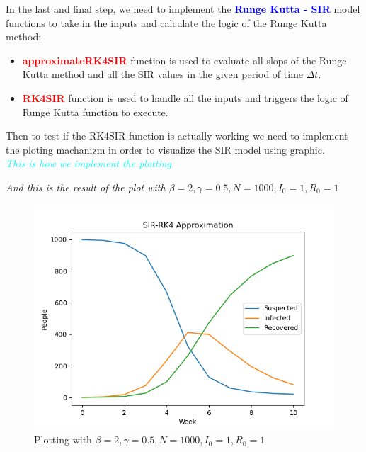 \documentclass[a4paper]{article}
\begin{document}
            In the last and final step, we need to implement the \textbf{\textcolor{blue}{Runge Kutta - SIR}} model functions to take in the inputs and calculate the logic of the Runge Kutta method: 
        
        \begin{itemize}
            \item \textbf{\textcolor{red}{approximateRK4SIR}} function is used to evaluate all slops of the Runge Kutta method and all the SIR values in the given period of time $\Delta t$.
            
            
            \item \textbf{\textcolor{red}{RK4SIR}} function is used to handle all the inputs and triggers the logic of Runge Kutta function to execute. 
            
        \end{itemize}
        Then to test if the RK4SIR function is actually working we need to implement the ploting machanizm in order to visualize the SIR model using graphic.
        \\
        \emph{\textcolor{cyan}{This is how we implement the plotting}}
        
        
        \emph{And this is the result of the plot with $\beta = 2, \gamma = 0.5, N = 1000, I_0 = 1, R_0 =1$}
        \begin{figure}[h!]
            \centering
            \includegraphics[width=1\linewidth]{Images/plotRK4.png}
            \caption*{Plotting with $\beta = 2, \gamma = 0.5, N = 1000, I_0 = 1, R_0 =1$}
        \end{figure}
\end{document}
